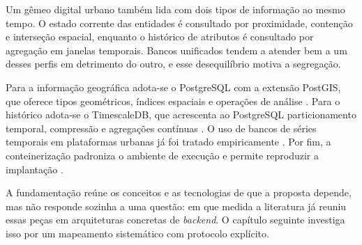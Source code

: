Um gêmeo digital urbano também lida com dois tipos de informação ao mesmo tempo. O estado corrente das entidades é consultado por proximidade, contenção e interseção espacial, enquanto o histórico de atributos é consultado por agregação em janelas temporais. Bancos unificados tendem a atender bem a um desses perfis em detrimento do outro, e esse desequilíbrio motiva a segregação.

Para a informação geográfica adota-se o PostgreSQL com a extensão PostGIS, que oferece tipos geométricos, índices espaciais e operações de análise \cite{obe2021postgis}. Para o histórico adota-se o TimescaleDB, que acrescenta ao PostgreSQL particionamento temporal, compressão e agregações contínuas \cite{timescale2025docs}. O uso de bancos de séries temporais em plataformas urbanas já foi tratado empiricamente \cite{john2023application,rudakov2023comparison}. Por fim, a conteinerização padroniza o ambiente de execução e permite reproduzir a implantação \cite{ahmed2018docker}.

A fundamentação reúne os conceitos e as tecnologias de que a proposta depende, mas não responde sozinha a uma questão: em que medida a literatura já reuniu essas peças em arquiteturas concretas de \textit{backend}. O capítulo seguinte investiga isso por um mapeamento sistemático com protocolo explícito.
